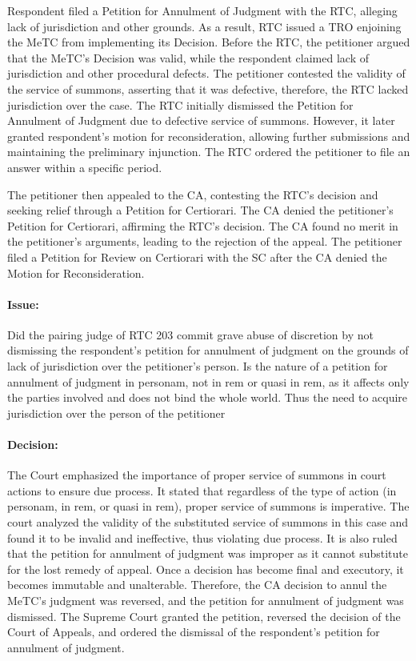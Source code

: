 \documentclass[
12pt,
oneside,
onehalfspacing,
headsepline
]{DigestCollection}
\begin{document}
Respondent filed a Petition for Annulment of Judgment with the RTC, alleging lack of jurisdiction and other grounds. As a result, RTC issued a TRO enjoining the MeTC from implementing its Decision. Before the RTC, the petitioner argued that the MeTC's Decision was valid, while the respondent claimed lack of jurisdiction and other procedural defects. The petitioner contested the validity of the service of summons, asserting that it was defective, therefore, the RTC lacked jurisdiction over the case. The RTC initially dismissed the Petition for Annulment of Judgment due to defective service of summons. However, it later granted respondent's motion for reconsideration, allowing further submissions and maintaining the preliminary injunction. The RTC ordered the petitioner to file an answer within a specific period.

The petitioner then appealed to the CA, contesting the RTC's decision and seeking relief through a Petition for Certiorari. The CA denied the petitioner's Petition for Certiorari, affirming the RTC's decision. The CA found no merit in the petitioner's arguments, leading to the rejection of the appeal. The petitioner filed a Petition for Review on Certiorari with the SC after the CA denied the Motion for Reconsideration.

\paragraph{Issue:}

Did the pairing judge of RTC 203 commit grave abuse of discretion by not dismissing the respondent's petition for annulment of judgment on the grounds of lack of jurisdiction over the petitioner's person. Is the nature of a petition for annulment of judgment in personam, not in rem or quasi in rem, as it affects only the parties involved and does not bind the whole world. Thus the need to acquire jurisdiction over the person of the petitioner

\paragraph{Decision:}

The Court emphasized the importance of proper service of summons in court actions to ensure due process. It stated that regardless of the type of action (in personam, in rem, or quasi in rem), proper service of summons is imperative. The court analyzed the validity of the substituted service of summons in this case and found it to be invalid and ineffective, thus violating due process. It is also ruled that the petition for annulment of judgment was improper as it cannot substitute for the lost remedy of appeal. Once a decision has become final and executory, it becomes immutable and unalterable. Therefore, the CA decision to annul the MeTC's judgment was reversed, and the petition for annulment of judgment was dismissed. The Supreme Court granted the petition, reversed the decision of the Court of Appeals, and ordered the dismissal of the respondent's petition for annulment of judgment.
\end{document}

